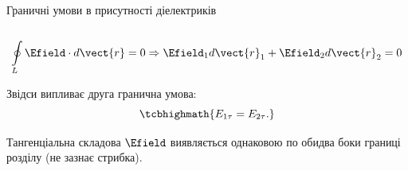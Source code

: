 \documentclass[onlytextwidth]{beamer}
\begin{document}
\begin{frame}{Граничні умови в присутності діелектриків}{}
\begin{onlyenv}
\begin{columns}
\begin{column}{0.6\linewidth}
\begin{block}{}
				\end{block}
			\end{column}
			\begin{column}{0.4\linewidth}\centering
				
			\end{column}
		\end{columns}
		\begin{block}{}
			\begin{equation*}
				\oint\limits_L \Efield\cdot d\vect{r} = 0 \Rightarrow \Efield_1 d\vect{r}_1 +
				\Efield_2 d\vect{r}_2 = 0
			\end{equation*}
		\end{block}
		\begin{block}{}
			Звідси випливає друга гранична умова:
			\begin{equation*}
				\tcbhighmath{
					E_{1\tau} = E_{2\tau}.
				}
			\end{equation*}
		\end{block}
		\begin{alertblock}{}\justifying
			Тангенціальна складова $\Efield$ виявляється однаковою по обидва боки границі розділу
			(не
			зазнає стрибка).
		\end{alertblock}
	\end{onlyenv}
\end{frame}
\end{document}
